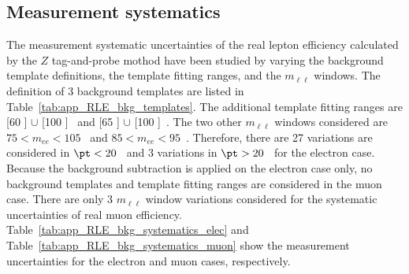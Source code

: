 \subsection{Measurement systematics}
\label{subsec:app_RLE_bkg_systematics}
The measurement systematic uncertainties of the real lepton efficiency calculated by the $Z$ tag-and-probe mothod have been studied by varying the background template definitions, the template fitting ranges, and the $m_{\ell \ell}$ windows.
The definition of 3 background templates are listed in Table~\ref{tab:app_RLE_bkg_templates}.
The additional template fitting ranges are [60 ] $\cup$ [100 ]~{\GeV} and [65 ] $\cup$ [100 ]~{\GeV}.
The two other $m_{\ell \ell}$ windows considered are $75 < m_{ee} < 105$~{\GeV} and $85 < m_{ee} < 95$~{\GeV}.
Therefore, there are 27 variations are considered in $\pt < 20$~{\GeV} and 3 variations in $\pt > 20$~{\GeV} for the electron case.
Because the background subtraction is applied on the electron case only, no background templates and template fitting ranges are considered in the muon case.
There are only 3 $m_{\ell \ell}$ window variations considered for the systematic uncertainties of real muon efficiency.
Table~\ref{tab:app_RLE_bkg_systematics_elec} and Table~\ref{tab:app_RLE_bkg_systematics_muon} show the measurement uncertainties for the electron and muon cases, respectively.

